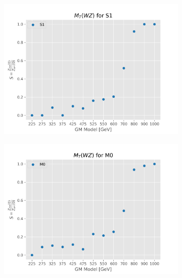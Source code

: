 \documentclass[../Bachelorarbeit.tex]{subfiles}
\begin{document}
\begin{figure}[h]
    \centering
    \begin{subfigure}{0.45\textwidth}
        \includegraphics[width=\textwidth]{Plots/gm_relevanze/MTWZ_op_S1.png}
        \caption{}
    \end{subfigure}
    \begin{subfigure}{0.45\textwidth}
        \includegraphics[width=\textwidth]{Plots/gm_relevanze/MTWZ_op_M0.png}
        \caption{}
    \end{subfigure}
    \begin{subfigure}{0.45\textwidth}

\end{subfigure}
\end{figure}
\end{document}
